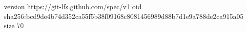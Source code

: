 version https://git-lfs.github.com/spec/v1
oid sha256:bcd9de4b74d352ca55f5b38f09168c8081456989d88b7d1e9a788de2ca915a05
size 70
